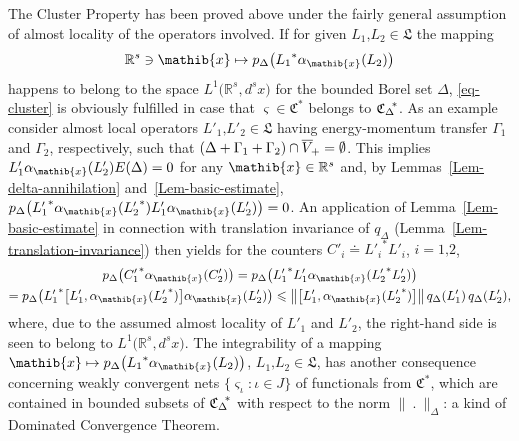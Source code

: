 \documentclass[11pt,twoside,openright]{report}
\theoremstyle{definition}
\theoremstyle{plain}
\theoremstyle{remark}
\theoremstyle{assumption}
\newcommand{\bset}[1]{\bigl\{ #1 \bigr\}}
\newcommand{\bcomm}[2]{\bigl[ #1 , #2 \bigr]}
\newcommand{\norm}[1]{\lVert #1 \rVert}
\newcommand{\bnorm}[1]{\bigl\lVert #1 \bigr\rVert}
\newcommand{\bpDx}[1]{p_\Delta \bigl( #1 \bigr)}
\newcommand{\qD}{q_\Delta}
\newcommand{\qDx}[1]{q_\Delta ( #1 )}
\newcommand{\Lfrak}{\mathfrak{L}}
\newcommand{\xib}{\mathib{x}}
\newcommand{\Rs}{\mathbb{R}^s}
\newcommand{\fwcone}{\overline{V}_{\negthinspace +}}
\newcommand{\ED}{E ( \Delta )}
\newcommand{\Cstar}{\mathfrak{C}^*}
\newcommand{\CDstar}{{\mathfrak{C}_\Delta}^{\negthickspace *}}
\newcommand{\aibx}{\alpha_\mathib{x}}
\begin{document}

The Cluster Property has been proved above under the fairly general
assumption of almost locality of the operators involved. If for given
$L_1 \text{,} L_2 \in \Lfrak$ the mapping
\begin{equation*}
  \Rs \ni \xib \mapsto \bpDx{{L_1}^* \aibx ( L_2 )}
\end{equation*}
happens to belong to the space $L^1 \bigl( \Rs , d^s x \bigr)$ for the
bounded Borel set $\Delta$, \eqref{eq-cluster} is obviously fulfilled
in case that $\varsigma \in \Cstar$ belongs to $\CDstar$. As an
example consider almost local operators $L'_1 \text{,} L'_2 \in
\Lfrak$ having energy-momentum transfer $\Gamma_1$ and $\Gamma_2$,
respectively, such that $( \Delta + \Gamma_1 + \Gamma_2 ) \cap \fwcone
= \emptyset$. This implies $L'_1 \aibx ( L'_2 ) \ED = 0$ for any $\xib
\in \Rs$ and, by Lemmas~\ref{Lem-delta-annihilation}
and~\ref{Lem-basic-estimate}, $\bpDx{{L'_1}^* \aibx ( {L'_2}^* ) L'_1
\aibx ( L'_2 )} = 0$. An application of Lemma~\ref{Lem-basic-estimate}
in connection with translation invariance of $\qD$
(Lemma~\ref{Lem-translation-invariance}) then yields for the counters
$C'_i \doteq {L'_i}^* L'_i$, $i = 1 \text{,} 2$,
\begin{multline*}
  \bpDx{{C'_1}^* \aibx ( C'_2 )} = \bpDx{{L'_1}^* L'_1 \aibx (
  {L'_2}^* L'_2 )} \\
  = \bpDx{{L'_1}^* \bcomm{L'_1}{\aibx ( {L'_2}^* )} \aibx ( L'_2 )}
  \leqslant \bnorm{\bcomm{L'_1}{\aibx ( {L'_2}^* )}} \, \qDx{L'_1} \,
  \qDx{L'_2} \text{,}
\end{multline*}
where, due to the assumed almost locality of $L'_1$ and $L'_2$, the
right-hand side is seen to belong to $L^1 \bigl( \Rs , d^s x \bigr)$.
The integrability of a mapping $\xib \mapsto \bpDx{{L_1}^* \aibx ( L_2
)}$, $L_1 \text{,} L_2 \in \Lfrak$, has another consequence concerning
weakly convergent nets $\bset{\varsigma_\iota : \iota \in J}$ of
functionals from $\Cstar$, which are contained in bounded subsets of
$\CDstar$ with respect to the norm $\norm{~.~}_\Delta$: a kind of
Dominated Convergence Theorem.
\end{document}
